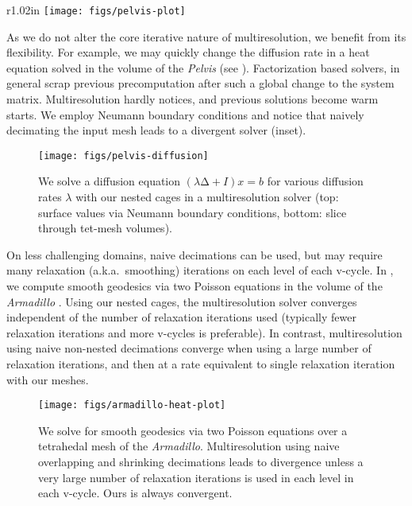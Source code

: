 \begin{wrapfigure}{r}{1.02in}
%
\centering
%
\texttt{[image: figs/pelvis-plot]}
%
\end{wrapfigure}
%
As we do not alter the core iterative nature of multiresolution, we benefit
from its flexibility. For example, we may quickly change the diffusion rate in
a heat equation solved in the volume of the \emph{Pelvis} (see
). 
%
Factorization based solvers, in general scrap previous precomputation after
such a global change to the system matrix. 
%
Multiresolution hardly notices, and previous solutions become warm starts.
%
We employ Neumann boundary conditions and notice that naively decimating the
input mesh leads to a divergent solver (inset).

\begin{figure}
  \texttt{[image: figs/pelvis-diffusion]}
  \caption{We solve a diffusion equation $(λ∆+I) x = b$ for various diffusion
  rates $λ$ with our nested cages in a multiresolution solver (top: surface
  values via Neumann boundary conditions, bottom: slice through tet-mesh
  volumes).}
  \label{fig:pelvis-diffusion}
\end{figure}

On less challenging domains, naive decimations can be used, but may require
many relaxation (a.k.a.\ smoothing) iterations on each level of each v-cycle.
%
In , we compute smooth geodesics via two Poisson
equations in the volume of the \emph{Armadillo} \cite{Crane:2013:RFV}.
%
Using our nested cages, the multiresolution solver converges independent of the
number of relaxation iterations used (typically fewer relaxation iterations and
more v-cycles is preferable).
%
In contrast, multiresolution using naive non-nested decimations converge when
using a large number of relaxation iterations, and then at a rate equivalent to
single relaxation iteration with our meshes.

\begin{figure}
  \texttt{[image: figs/armadillo-heat-plot]}
  \caption{We solve for smooth geodesics via two Poisson equations over a
  tetrahedal mesh of the \emph{Armadillo}. Multiresolution using naive
  overlapping and shrinking decimations leads to divergence unless a very large
  number of relaxation iterations is used in each level in each v-cycle. Ours
  is always convergent.}
  \label{fig:armadillo-heat-plot}
\end{figure}

